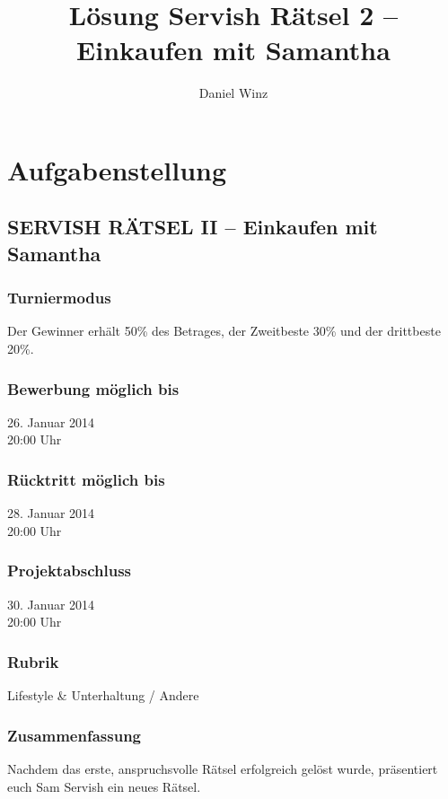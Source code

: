 \documentclass[10pt, fleqn]{article}
\title{Lösung Servish Rätsel 2 -- Einkaufen mit Samantha}
\author{Daniel Winz}
\begin{document}
\maketitle
\newpage
\tableofcontents
\newpage

\section{Aufgabenstellung}

\subsection*{SERVISH RÄTSEL II -- Einkaufen mit Samantha}

\subsubsection*{Turniermodus}
Der Gewinner erhält 50\% des Betrages, der Zweitbeste 30\% und der drittbeste 20\%. 

\subsubsection*{Bewerbung möglich bis}
26. Januar 2014 \\
20:00 Uhr 

\subsubsection*{Rücktritt möglich bis}
28. Januar 2014 \\
20:00 Uhr 

\subsubsection*{Projektabschluss}
30. Januar 2014 \\
20:00 Uhr 

\subsubsection*{Rubrik}
Lifestyle \& Unterhaltung / Andere

\subsubsection*{Zusammenfassung}
Nachdem das erste, anspruchsvolle Rätsel erfolgreich gelöst wurde, präsentiert 
euch Sam Servish ein neues Rätsel. 
\end{document}

